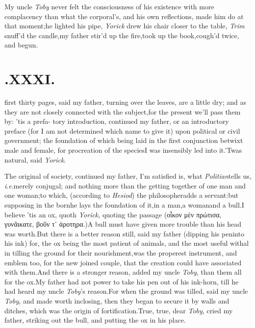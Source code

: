 \documentclass{article}
\begin{document}
My uncle \textit{Toby} never felt the consci\-ousness of his
existence with more complacency than what the corporal’s, and
his own reflections, made him do at that moment;\tsh he
lighted his pipe,\tsh\break
\textit{Yorick} drew his chair closer to the table,\break
\tsk \textit{Trim} snuff’d the candle,\tsk my
father stir’d up the fire,\tsk took up the
book,\tsk cough’d twice, and begun.

\section{.\enspace  XXXI.}

 first thirty pages, said my\break
father, turning over the leaves,\tsk\break
are a little dry; and as they are not closely connected with the
subject,\tsh for the present we’ll pass them by: ’tis a prefa- tory
introduction, continued my father, or an introductory preface (for I am
not determined which name to give it) upon political or civil
government; the foundation of which being laid in the first conjunction
betwixt male and female,\break
for procreation of the species\tsh I was
insensibly led into it.\tsh ’Twas natural, said \textit{Yorick}.

The original of society, continued my father, I’m
satisfied is, what \textit{Politian}\break tells
us, \textit{i}.\@ \textit{e}.\@ merely conjugal;
and no\-thing more than the getting together of one
man and one woman;\tsk to which, (according to
\textit{Hesiod}) the philosopher\break adds a
servant:\tsk but supposing in the  born\tsh he lays the
foundation of it,\break in a man,\tsk a woman\tsk and a
bull.\tsh I believe ’tis an ox, quoth
\textit{Yorick}, quoting the passage ({\small οἶκον
μὲν πρώτισα\sic, γυνᾶικα\break τε, βοῦν τ᾽ ἀροτηρα}.)\tsh A
bull must have given more trouble than
his head was worth.\tsh But there is a better
reason still, said my father (dipping his pen\break into
his ink) for, the ox being the most patient of
animals, and the most useful withal in tilling the
ground for their nourishment,\tsk was the properest
instrument, and emblem too, for the new join\-ed
couple, that the creation could have associated
with them.\tsk And there is a stronger reason,
added my uncle \textit{Toby}, than them all for the
ox.\tsk My father had not power to take his pen out
of his ink-horn, till he had heard my uncle
\textit{Toby}’s reason.\tsk For when the ground was
til\-led, said my uncle \textit{Toby}, and made worth
inclosing, then they began to secure it by walls
and ditches, which was the origin of
fortification.\tsh True, true, dear \textit{Toby},
cried my father, striking out the bull, and putting
the ox in his place.
\end{document}
